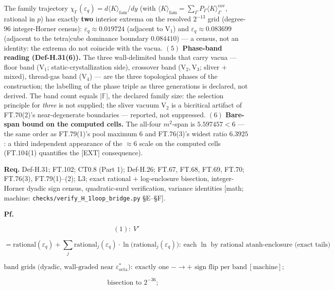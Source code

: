 \begin{theorem}
The family trajectory $\chi_{\mathbb F}(\varepsilon_q)=d\langle K\rangle_{\mathrm{fam}}/dy$ (with $\langle K\rangle_{\mathrm{fam}}=\sum_\Gamma P_\Gamma\langle K\rangle^{\mathrm{cov}}_\Gamma$, rational in $p$) has exactly \textbf{two} interior extrema on the resolved $2^{-13}$ grid (degree-$96$ integer-Horner census): $\varepsilon_q\approx0.019724$ (adjacent to $\mathrm V_1$) and $\varepsilon_q\approx0.083699$ (adjacent to the tetra$|$cube dominance boundary $0.084410$) — a census, not an identity: the extrema do not coincide with the vacua. $(5)$ \textbf{Phase-band reading (Def-H.31(6)).} The three wall-delimited bands that carry vacua — floor band ($\mathrm V_1$; static-crystallization side), crossover band ($\mathrm V_2,\mathrm V_3$; sliver $+$ mixed), thread-gas band ($\mathrm V_4$) — are the three topological phases of the construction; the labelling of the phase triple as three generations is declared, not derived. The band count equals $|\mathbb F|$, the declared family size: the selection principle for \textit{three} is not supplied; the sliver vacuum $\mathrm V_2$ is a bicritical artifact of FT.70(2)'s near-degenerate boundaries — reported, not suppressed. $(6)$ \textbf{Bare-span bound on the computed cells.} The all-four $m^2$-span is $5.597457<6$ — the same order as FT.79(1)'s pool maximum $6$ and FT.76(3)'s widest ratio $6.3925$: a third independent appearance of the $\approx6$ scale on the computed cells (FT.104(1) quantifies the [EXT] consequence).

\textbf{Req.} Def-H.31; FT.102; CT0.8 (Part 1); Def-H.26; FT.67, FT.68, FT.69, FT.70; FT.76(3), FT.79(1)–(2); L3; exact rational $+$ log-enclosure bisection, integer-Horner dyadic sign census, quadratic-surd verification, variance identities [math; machine: \texttt{checks/\allowbreak{}verify\_\allowbreak{}H\_\allowbreak{}1loop\_\allowbreak{}bridge.py} §E–§F].

\textbf{Pf.}

\[
(1):\ V'
\]

\[
= \text{rational}(\varepsilon_q)+\sum_j\text{rational}_j(\varepsilon_q)\cdot\ln\bigl(\text{rational}_j(\varepsilon_q)\bigr):\ \text{each }\ln\text{ by rational atanh-enclosure (exact tails)}
\]

\[
\text{band grids (dyadic, wall-graded near }\varepsilon^*_{\mathrm{octa}}\text{)}:\ \text{exactly one }-\to+\text{ sign flip per band}\ [\text{machine}];
\]

\[
\qquad \text{bisection to }2^{-36};
\]


\end{theorem}
